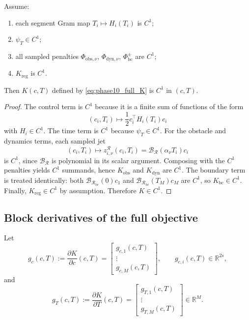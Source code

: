 \begin{proposition}
\label{prop:phase10_K_C1}
Assume:
\begin{enumerate}
    \item each segment Gram map \(T_i\mapsto H_i(T_i)\) is \(C^1\);
    \item \(\psi_T\in C^1\);
    \item all sampled penalties \(\Phi_{\mathrm{obs},\nu}\), \(\Phi_{\mathrm{dyn},\nu}\), \(\Phi_{\mathrm{bc}}^\pm\) are \(C^1\);
    \item \(K_{\mathrm{reg}}\) is \(C^1\).
\end{enumerate}
Then \(K(c,T)\) defined by \eqref{eq:phase10_full_K} is \(C^1\) in \((c,T)\).
\end{proposition}

\begin{proof}
The control term is \(C^1\) because it is a finite sum of functions of the form
\[
(c_i,T_i)\mapsto \frac12 c_i^\top H_i(T_i)c_i
\]
with \(H_i\in C^1\).
The time term is \(C^1\) because \(\psi_T\in C^1\).
For the obstacle and dynamics terms, each sampled jet
\[
(c_i,T_i)\mapsto z_{i,\nu}^{\mathcal R}(c_i,T_i)
=
\mathcal B_{\mathcal R}(\alpha_\nu T_i)c_i
\]
is \(C^1\), since \(\mathcal B_{\mathcal R}\) is polynomial in its scalar argument.
Composing with the \(C^1\) penalties yields \(C^1\) summands, hence \(K_{\mathrm{obs}}\) and \(K_{\mathrm{dyn}}\) are \(C^1\).
The boundary term is treated identically: both \(\mathcal B_{\mathcal R_{\mathrm{bc}}}(0)c_1\) and \(\mathcal B_{\mathcal R_{\mathrm{bc}}}(T_M)c_M\) are \(C^1\), so \(K_{\mathrm{bc}}\in C^1\).
Finally, \(K_{\mathrm{reg}}\in C^1\) by assumption.
Therefore \(K\in C^1\).
\end{proof}

\subsection{Block derivatives of the full objective}
\label{subsec:phase10_block_grads}

Let
\[
g_c(c,T):=\frac{\partial K}{\partial c}(c,T)
=
\begin{bmatrix}
g_{c,1}(c,T)\\
\vdots\\
g_{c,M}(c,T)
\end{bmatrix},
\qquad
g_{c,i}(c,T)\in\mathbb R^{2s},
\]
and
\[
g_T(c,T):=\frac{\partial K}{\partial T}(c,T)
=
\begin{bmatrix}
g_{T,1}(c,T)\\
\vdots\\
g_{T,M}(c,T)
\end{bmatrix}
\in\mathbb R^{M}.
\]

